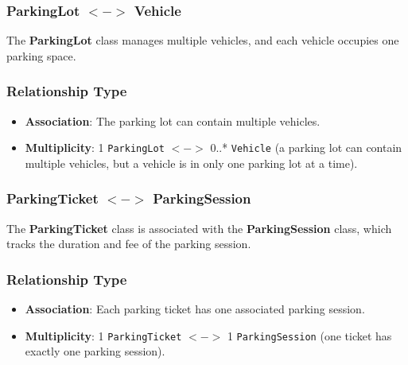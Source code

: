 \subsubsection{ParkingLot $<->$ Vehicle}
The \textbf{ParkingLot} class manages multiple vehicles, and each vehicle occupies one parking space.

\subsubsection*{Relationship Type}
\begin{itemize}
    \item \textbf{Association}: The parking lot can contain multiple vehicles.
    \item \textbf{Multiplicity}: 1 \texttt{ParkingLot} $<->$ 0..* \texttt{Vehicle} (a parking lot can contain multiple vehicles, but a vehicle is in only one parking lot at a time).
\end{itemize}

\subsubsection{ParkingTicket $<->$ ParkingSession}
The \textbf{ParkingTicket} class is associated with the \textbf{ParkingSession} class, which tracks the duration and fee of the parking session.

\subsubsection*{Relationship Type}
\begin{itemize}
    \item \textbf{Association}: Each parking ticket has one associated parking session.
    \item \textbf{Multiplicity}: 1 \texttt{ParkingTicket} $<->$ 1 \texttt{ParkingSession} (one ticket has exactly one parking session).
\end{itemize}
